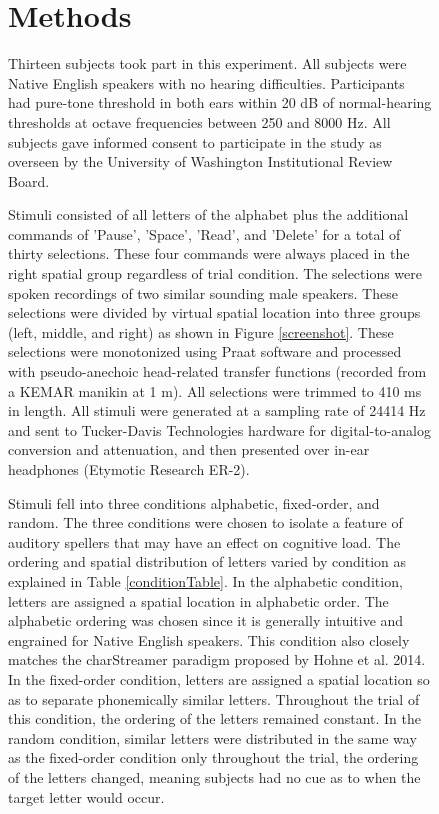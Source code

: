 \documentclass[10pt]{article}
\begin{document}
\begin{figure}
\section{Methods}

Thirteen subjects took part in this experiment.  All subjects were
Native English speakers with no hearing difficulties.  Participants
had pure-tone threshold in both ears within 20 dB of normal-hearing
thresholds at octave frequencies between 250 and 8000 Hz.  All
subjects gave informed consent to participate in the study as
overseen by the University of Washington Institutional Review Board.

Stimuli consisted of all letters of the alphabet plus the
additional commands of 'Pause', 'Space', 'Read', and 'Delete'
for a total of thirty selections.  These four commands were
always placed in the right spatial group regardless of trial
condition.  The selections were spoken recordings of two
similar sounding male speakers.  These selections were divided
by virtual spatial location into three groups (left, middle,
and right) as shown in Figure \ref{screenshot}.  These
selections were monotonized using Praat software and processed
with pseudo-anechoic head-related transfer functions (recorded
from a KEMAR manikin at 1 m).  All selections were trimmed to
410 ms in length.  All stimuli were generated at a
sampling rate of 24414 Hz and sent to Tucker-Davis
Technologies hardware for digital-to-analog conversion and
attenuation, and then presented over in-ear headphones
(Etymotic Research ER-2).

Stimuli fell into three conditions alphabetic, fixed-order,
and random.  The three conditions were chosen to isolate a
feature of auditory spellers that may have an effect on
cognitive load.  The ordering and spatial distribution of
letters varied by condition as explained in Table
\ref{conditionTable}.  In the alphabetic condition, letters
are assigned a spatial location in alphabetic order.  The
alphabetic ordering was chosen since it is generally intuitive
and engrained for Native English speakers.  This condition
also closely matches the charStreamer paradigm proposed by
Hohne et al.  2014\cite{Hohne2014}.  In the fixed-order
condition, letters are assigned a spatial location so as to
separate phonemically similar letters.  Throughout the trial
of this condition, the ordering of the letters remained
constant.  In the random condition, similar letters were
distributed in the same way as the fixed-order condition only
throughout the trial, the ordering of the letters changed,
meaning subjects had no cue as to when the target letter would
occur. 


\end{figure}
\end{document}
